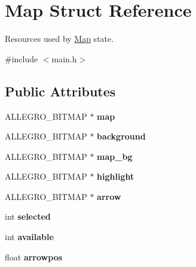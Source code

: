 \hypertarget{structMap}{\section{\-Map \-Struct \-Reference}
\label{structMap}
}


\-Resources used by \hyperlink{structMap}{\-Map} state.  




{\ttfamily \#include $<$main.\-h$>$}

\subsection*{\-Public \-Attributes}
\begin{DoxyCompactItemize}
\item 
\hypertarget{structMap_abaf70186fbb2b4b047b8350e3ec5347c}{\-A\-L\-L\-E\-G\-R\-O\-\_\-\-B\-I\-T\-M\-A\-P $\ast$ {\bfseries map}}\label{structMap_abaf70186fbb2b4b047b8350e3ec5347c}

\item 
\hypertarget{structMap_ae4d43e7eb0694d06b3eea8552fe68ea2}{\-A\-L\-L\-E\-G\-R\-O\-\_\-\-B\-I\-T\-M\-A\-P $\ast$ {\bfseries background}}\label{structMap_ae4d43e7eb0694d06b3eea8552fe68ea2}

\item 
\hypertarget{structMap_ac0b084971832b4466a9d91233452378d}{\-A\-L\-L\-E\-G\-R\-O\-\_\-\-B\-I\-T\-M\-A\-P $\ast$ {\bfseries map\-\_\-bg}}\label{structMap_ac0b084971832b4466a9d91233452378d}

\item 
\hypertarget{structMap_a703b41e358b7c8ff39bf0d8dd37bb408}{\-A\-L\-L\-E\-G\-R\-O\-\_\-\-B\-I\-T\-M\-A\-P $\ast$ {\bfseries highlight}}\label{structMap_a703b41e358b7c8ff39bf0d8dd37bb408}

\item 
\hypertarget{structMap_a607f79d7c594540ebf58f88fb999250d}{\-A\-L\-L\-E\-G\-R\-O\-\_\-\-B\-I\-T\-M\-A\-P $\ast$ {\bfseries arrow}}\label{structMap_a607f79d7c594540ebf58f88fb999250d}

\item 
\hypertarget{structMap_a07b3269191a003d517977da3adc7f0a4}{int {\bfseries selected}}\label{structMap_a07b3269191a003d517977da3adc7f0a4}

\item 
\hypertarget{structMap_aa000e129cf19d6d6d9a78cfce0ef58fc}{int {\bfseries available}}\label{structMap_aa000e129cf19d6d6d9a78cfce0ef58fc}

\item 
\hypertarget{structMap_a4f395f7bdf7bc0782e29e996e87237bb}{float {\bfseries arrowpos}}\label{structMap_a4f395f7bdf7bc0782e29e996e87237bb}


\end{DoxyCompactItemize}
